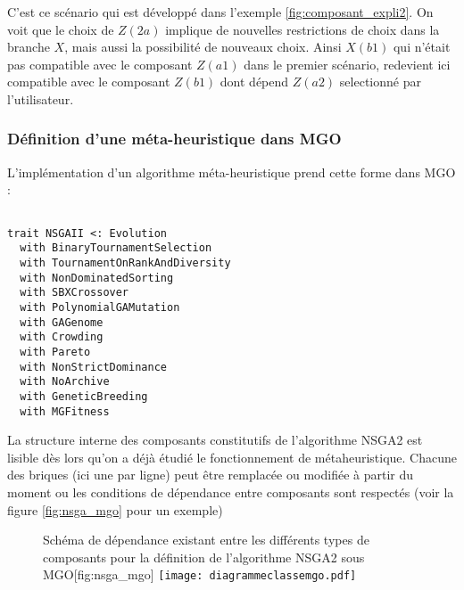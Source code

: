 C'est ce scénario qui est développé dans l'exemple \ref{fig:composant_expli2}. On voit que le choix de $Z(2a)$ implique de nouvelles restrictions de choix dans la branche $X$, mais aussi la possibilité de nouveaux choix. Ainsi $X(b1)$ qui n'était pas compatible avec le composant $Z(a1)$ dans le premier scénario, redevient ici compatible avec le composant $Z(b1)$ dont dépend $Z(a2)$ selectionné par l'utilisateur.


\subsubsection{Définition d'une méta-heuristique dans MGO}

L'implémentation d'un algorithme méta-heuristique prend cette forme dans MGO :

\begin{listing}[H]

\begin{verbatim}

trait NSGAII <: Evolution
  with BinaryTournamentSelection
  with TournamentOnRankAndDiversity
  with NonDominatedSorting
  with SBXCrossover
  with PolynomialGAMutation
  with GAGenome
  with Crowding
  with Pareto
  with NonStrictDominance
  with NoArchive
  with GeneticBreeding
  with MGFitness

\end{verbatim}
\caption{Exemple de définition d'une méta-heuristique dans MGO}
\label{alg:nsga2}
\end{listing}

La structure interne des composants constitutifs de l'algorithme NSGA2 est lisible dès lors qu'on a déjà étudié le fonctionnement de métaheuristique. Chacune des briques (ici une par ligne) peut être remplacée ou modifiée à partir du moment ou les conditions de dépendance entre composants sont respectés (voir la figure \ref{fig:nsga_mgo} pour un exemple)

\begin{figure}[ht]
	\begin{sidecaption}{Schéma de dépendance existant entre les différents types de composants pour la définition de l'algorithme NSGA2 sous MGO}[fig:nsga_mgo]
		\centering
		\texttt{[image: diagrammeclassemgo.pdf]}{
		}
  \end{sidecaption}
\end{figure}

